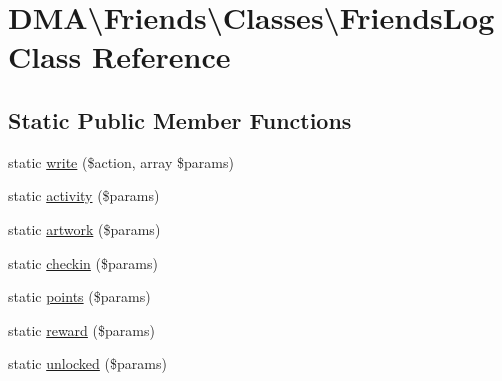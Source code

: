 \hypertarget{classDMA_1_1Friends_1_1Classes_1_1FriendsLog}{\section{D\-M\-A\textbackslash{}Friends\textbackslash{}Classes\textbackslash{}Friends\-Log Class Reference}
\label{classDMA_1_1Friends_1_1Classes_1_1FriendsLog}
}
\subsection*{Static Public Member Functions}
\begin{DoxyCompactItemize}
\item 
static \hyperlink{classDMA_1_1Friends_1_1Classes_1_1FriendsLog_a99a5a2ee4bc69aab07f58308d9cee669}{write} (\$action, array \$params)
\item 
static \hyperlink{classDMA_1_1Friends_1_1Classes_1_1FriendsLog_a0b90db29da51f53991f2dcc1a55f14c7}{activity} (\$params)
\item 
static \hyperlink{classDMA_1_1Friends_1_1Classes_1_1FriendsLog_aa3c63d0a5b1ffcd9f58c03e443a2dc8f}{artwork} (\$params)
\item 
static \hyperlink{classDMA_1_1Friends_1_1Classes_1_1FriendsLog_ae6c33847a3d3f094a3bd27ac2dbbfa72}{checkin} (\$params)
\item 
static \hyperlink{classDMA_1_1Friends_1_1Classes_1_1FriendsLog_a083fa01b3e143ca77bdbb1562db724de}{points} (\$params)
\item 
static \hyperlink{classDMA_1_1Friends_1_1Classes_1_1FriendsLog_a9f38b9c2e3b1c9d36bc7a1247b2571eb}{reward} (\$params)
\item 
static \hyperlink{classDMA_1_1Friends_1_1Classes_1_1FriendsLog_ac7705d4873f6b3156efde3e049a21ca6}{unlocked} (\$params)
\end{DoxyCompactItemize}


